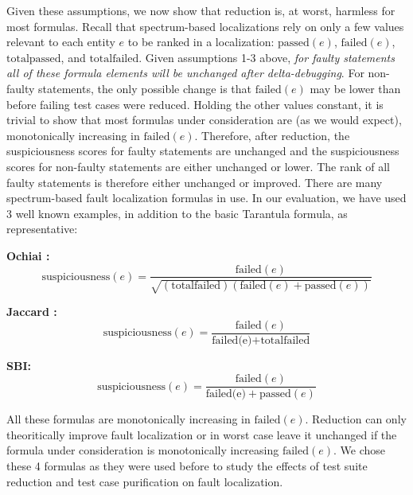 Given these assumptions, we now show that reduction is, at worst,
harmless for most formulas.  Recall that spectrum-based localizations
rely on only a few values relevant to each entity $e$ to be ranked in
a localization: $\text{passed}(e)$, $\text{failed}(e)$,
$\text{totalpassed}$, and $\text{totalfailed}$.  Given assumptions 1-3
above, \emph{for faulty statements all of these formula elements will
be unchanged after delta-debugging}.  For non-faulty statements, the
only possible change is that $ \text{failed}(e)$ may be lower than
before failing test cases were reduced. Holding the other values
constant, it is trivial to show that most formulas under consideration
are (as we would expect), monotonically increasing in
$\text{failed}(e)$.  Therefore, after reduction, the suspiciousness
scores for faulty statements are unchanged and the suspiciousness
scores for non-faulty statements are either unchanged or lower.  The
rank of all faulty statements is therefore either unchanged or
improved.  There are many spectrum-based fault localization formulas
in use. In our evaluation, we have used 3 well known examples, in
addition to the basic Tarantula \cite{Jones2002} formula, as
representative:

{\bf Ochiai \cite{Ochai}:}
$$ \text{suspiciousness}(e) = \frac{\text{failed}(e)}{\sqrt{(\text{totalfailed}) (\text{failed}(e) + \text{passed}(e))}} $$

{\bf Jaccard \cite{Pinpoint}:}
$$ \text{suspiciousness}(e) = \frac{\text{failed}(e)}{\text{failed(e)} + \text{totalfailed}} $$

{\bf SBI: \cite{EmpirReduce,StatDebug}}
$$ \text{suspiciousness}(e) = \frac{\text{failed}(e)}{\text{failed(e)} + \text{passed}(e)} $$


All these formulas are monotonically increasing in
$\text{failed}(e)$.%
Reduction can only
theoritically improve fault localization or in worst case leave it
unchanged if the formula under consideration is monotonically
increasing $\text{failed}(e)$. We chose these 4 formulas as they were
used before to study the effects of test suite reduction
\cite{EmpirReduce} and test case purification
\cite{PureTest} on fault localization.



